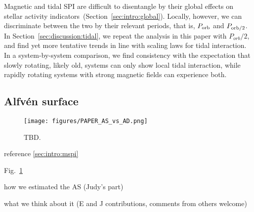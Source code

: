 \documentclass[twocolumn]{aastex631}
\begin{document}
Magnetic and tidal SPI are difficult to disentangle by their global effects on stellar activity indicators~(Section~\ref{sec:intro:global}). Locally, however, we can discriminate between the two by their relevant periods, that is, $P_{\rm orb}$ and $P_{\rm orb /2}$. In Section~\ref{sec:discussion:tidal}, we repeat the analysis in this paper with $P_{orb}/2$, and find yet more tentative trends in line with scaling laws for tidal interaction. In a system-by-system comparison, we find consistency with the expectation that slowly rotating, likely old, systems can only show local tidal interaction, while rapidly rotating systems with strong magnetic fields can experience both.
\subsection{Alfv\'en surface}
\label{sec:discussion:as}

\begin{figure}[t]
    \begin{centering}
        \texttt{[image: figures/PAPER\_AS\_vs\_AD.png]}
    \caption{ TBD.}
        \label{fig:as}
    \end{centering}
\end{figure}

reference \ref{sec:intro:mspi}

Fig.~\ref{fig:as}

how we estimated the AS (Judy's part)


what we think about it (E and J contributions, comments from others  welcome)
\end{document}
